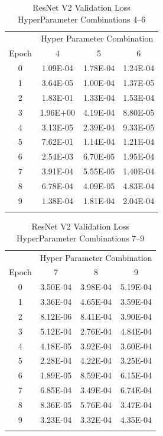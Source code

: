 \documentclass[10pt, conference]{IEEEtran}
\begin{document}
\begin{table}[H]
    \centering
    \begin{tabular}{@{}cccc@{}}
        \toprule
        & \multicolumn{3}{c}{Hyper Parameter Combination} \\
        \cmidrule{2-4}
            Epoch  & 4 & 5 & 6\\
        \midrule

        0 & 1.09E-04 & 1.78E-04 & 1.24E-04 \\
        1 & 3.64E-05 & 1.00E-04 & 1.37E-05 \\
        2 & 1.83E-01 & 1.33E-04 & 1.53E-04 \\
        3 & 1.96E+00 & 4.19E-04 & 8.80E-05 \\
        4 & 3.13E-05 & 2.39E-04 & 9.33E-05 \\
        5 & 7.62E-01 & 1.14E-04 & 1.21E-04 \\
        6 & 2.54E-03 & 6.70E-05 & 1.95E-04 \\
        7 & 3.91E-04 & 5.55E-05 & 1.40E-04 \\
        8 & 6.78E-04 & 4.09E-05 & 4.83E-04 \\
        9 & 1.38E-04 & 1.81E-04 & 2.04E-04 \\

        \bottomrule\smallskip
    \end{tabular}
    \caption{ResNet V2 Validation Loss HyperParameter Combinations 4--6}%
    \label{table:ResNetValidationLoss4-6}
\end{table}


\begin{table}[H]
    \centering
    \begin{tabular}{@{}cccc@{}}
        \toprule
        & \multicolumn{3}{c}{Hyper Parameter Combination} \\
        \cmidrule{2-4}
            Epoch  & 7 & 8 & 9\\
        \midrule

        0 & 3.50E-04 & 3.98E-04 & 5.19E-04 \\
        1 & 3.36E-04 & 4.65E-04 & 3.59E-04 \\
        2 & 8.12E-06 & 8.41E-04 & 3.90E-04 \\
        3 & 5.12E-04 & 2.76E-04 & 4.84E-04 \\
        4 & 4.18E-05 & 3.92E-04 & 3.60E-04 \\
        5 & 2.28E-04 & 4.22E-04 & 3.25E-04 \\
        6 & 1.89E-05 & 8.59E-04 & 6.15E-04 \\
        7 & 6.85E-04 & 3.49E-04 & 6.74E-04 \\
        8 & 8.36E-05 & 5.76E-04 & 3.47E-04 \\
        9 & 3.23E-04 & 3.32E-04 & 4.35E-04 \\

        \bottomrule\smallskip
    \end{tabular}
    \caption{ResNet V2 Validation Loss HyperParameter Combinations 7--9}%
    \label{table:ResNetValidationLoss7-9}
\end{table}
\end{document}
